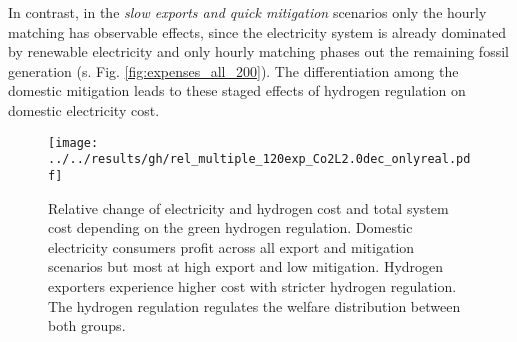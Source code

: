 In contrast, in the \textit{slow exports and quick mitigation} scenarios only the hourly matching has observable effects, since the electricity system is already  dominated by renewable electricity and only hourly matching phases out the remaining fossil generation (s. Fig. \ref{fig:expenses_all_200}). The differentiation among the domestic mitigation leads to these staged effects of hydrogen regulation on domestic electricity cost.


\begin{figure}[h!]
    \centering
    \texttt{[image: ../../results/gh/rel\_multiple\_120exp\_Co2L2.0dec\_onlyreal.pdf]}
    \caption{Relative change of electricity and hydrogen cost and total system cost depending on the green hydrogen regulation. Domestic electricity consumers profit across all export and mitigation scenarios but most at high export and low mitigation. Hydrogen exporters experience higher cost with stricter hydrogen regulation. The hydrogen regulation regulates the welfare distribution between both groups.}
    \label{fig:expenses_real_120}
\end{figure}






